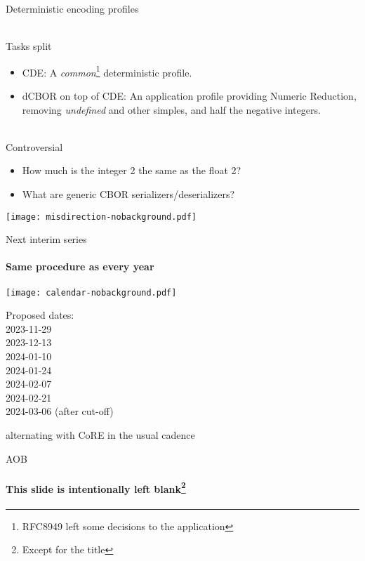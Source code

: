 \documentclass[aspectratio=169]{beamer}
\begin{document}
\begin{frame}{Deterministic encoding profiles}\large
    \begin{block}{\mbox{}\\Tasks split \hspace*{1em}}
    \begin{itemize}
        \item CDE: A \textit{common}\footnote{RFC8949 left some decisions to the application} deterministic profile.
        \item dCBOR on top of CDE: An application profile providing Numeric Reduction, removing \textit{undefined} and other simples, and half the negative integers.
    \end{itemize}
    \end{block}

    \bigskip

    \begin{block}{\mbox{}\\Controversial \hspace*{1em}}
    \begin{itemize}
        \item How much is the integer 2 the same as the float 2?
        \item What are generic CBOR serializers/deserializers?
    \end{itemize}
    \end{block}

    \vspace{-2em}
    \begin{block}{\texttt{[image: misdirection-nobackground.pdf]}}
    \end{block}
    \vspace{-2em}

\end{frame}

\begin{frame}{Next interim series}\large
    \framesubtitle{Same procedure as every year}
    \begin{block}{\texttt{[image: calendar-nobackground.pdf]}\mbox{\quad}}
    \end{block}
    \vspace{-2cm}

    Proposed dates:\\
    2023-11-29\\
    2023-12-13\\
    2024-01-10\\
    2024-01-24\\
    2024-02-07\\
    2024-02-21\\
    2024-03-06 (after cut-off)

    \bigskip

    alternating with CoRE in the usual cadence
\end{frame}

\begin{frame}{AOB}\large
    \framesubtitle{This slide is intentionally left blank\footnote{Except for the title}}
\end{frame}
\end{document}
